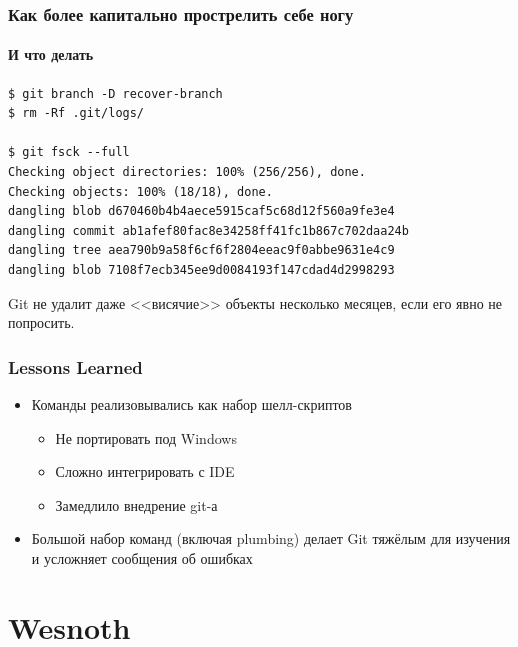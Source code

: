 \documentclass{../text-style}
\begin{document}
    \begin{frame}[fragile]
        \frametitle{Как более капитально прострелить себе ногу}
        \framesubtitle{И что делать}
        \begin{verbatim}
$ git branch -D recover-branch
$ rm -Rf .git/logs/

$ git fsck --full
Checking object directories: 100% (256/256), done.
Checking objects: 100% (18/18), done.
dangling blob d670460b4b4aece5915caf5c68d12f560a9fe3e4
dangling commit ab1afef80fac8e34258ff41fc1b867c702daa24b
dangling tree aea790b9a58f6cf6f2804eeac9f0abbe9631e4c9
dangling blob 7108f7ecb345ee9d0084193f147cdad4d2998293
        \end{verbatim}
        Git не удалит даже <<висячие>> объекты несколько месяцев, если его явно не попросить.
    \end{frame}

    \begin{frame}
        \frametitle{Lessons Learned}
        \begin{itemize}
            \item Команды реализовывались как набор шелл-скриптов
            \begin{itemize}
                \item Не портировать под Windows
                \item Сложно интегрировать с IDE
                \item Замедлило внедрение git-а
            \end{itemize}
            \item Большой набор команд (включая plumbing) делает Git тяжёлым для изучения и усложняет сообщения об ошибках
        \end{itemize}
    \end{frame}

    \section{Wesnoth}
\end{document}
